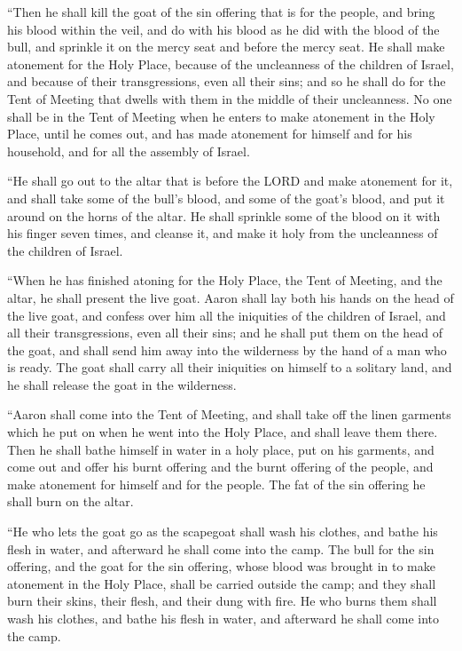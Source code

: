 \myverse{}“Then he shall kill the goat of the sin offering that is for
the people, and bring his blood within the veil, and do with his blood as he did with the blood of the
bull, and sprinkle it on the mercy seat and before the mercy seat.
\myverse{}He shall make atonement for the Holy Place, because of the uncleanness of
the children of Israel, and because of their transgressions, even all their sins; and so he shall do for
the Tent of Meeting that dwells with them in the middle of their uncleanness.
\myverse{}No one shall be in the Tent of Meeting when he enters to make atonement in
the Holy Place, until he comes out, and has made atonement for himself and for his household, and for
all the assembly of Israel.


\myverse{}“He shall go out to the altar that is before the LORD and make
atonement for it, and shall take some of the bull’s blood, and some of the goat’s blood, and put it around
on the horns of the altar.
\myverse{}He shall sprinkle some of the blood on it with his finger seven times, and
cleanse it, and make it holy from the uncleanness of the children of Israel.


\myverse{}“When he has finished atoning for the Holy Place, the Tent of
Meeting, and the altar, he shall present the live goat.
\myverse{}Aaron shall lay both his hands on the head of the live goat, and confess
over him all the iniquities of the children of Israel, and all their transgressions, even all their sins;
and he shall put them on the head of the goat, and shall send him away into the wilderness by the hand
of a man who is ready.
\myverse{}The goat shall carry all their iniquities on himself to a solitary land,
and he shall release the goat in the wilderness.


\myverse{}“Aaron shall come into the Tent of Meeting, and shall take off
the linen garments which he put on when he went into the Holy Place, and shall leave them there.
\myverse{}Then he shall bathe himself in water in a holy place, put on his garments,
and come out and offer his burnt offering and the burnt offering of the people, and make atonement for
himself and for the people.
\myverse{}The fat of the sin offering he shall burn on the altar.


\myverse{}“He who lets the goat go as the scapegoat shall wash his clothes,
and bathe his flesh in water, and afterward he shall come into the camp.
\myverse{}The bull for the sin offering, and the goat for the sin offering, whose blood
was brought in to make atonement in the Holy Place, shall be carried outside the camp; and they shall
burn their skins, their flesh, and their dung with fire.
\myverse{}He who burns them shall wash his clothes, and bathe his flesh in water, and
afterward he shall come into the camp.


